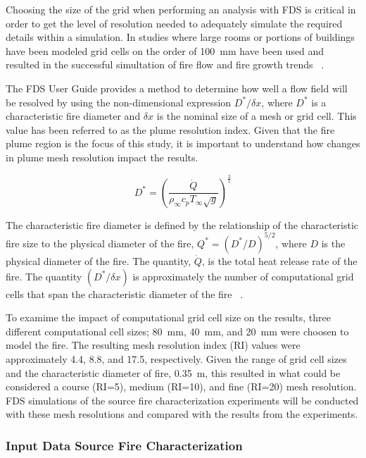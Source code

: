 \documentclass[twoside]{uocthesis}
\begin{document}
{Choosing the size of the grid when performing an analysis with FDS is critical in order to get the level of resolution needed to adequately simulate the required details within a simulation. In studies where large rooms or portions of buildings have been modeled grid cells on the order of 100~mm have been used and resulted in the successful simultation of fire flow and fire growth trends ~\cite{Grosshandler:Station,Madrzykowski:2004,Vettori:2000, Barowy:2012,Overholt:San_Francisco,Weinschenk:Chicago}.

 The FDS User Guide provides a method to determine how well a flow field will be resolved by using the non-dimensional expression ${D^*}/{\delta x}$, where $D^*$ is a characteristic fire diameter and $\delta x$ is the nominal size of a mesh or grid cell. This value has been referred to as the plume resolution index. Given that the fire plume region is the focus of this study, it is important to understand how changes in plume mesh resolution impact the results.    

\begin{equation}
 D^* = \left(
     \frac{\dot Q}{\rho_\infty  c_p  T_\infty  \sqrt{g} }
     \right)^\frac{2}{5} 
 \end{equation}


The characteristic fire diameter is defined by the relationship of the characteristic fire size to the physical diameter of the fire, ${Q^*} = ({D^*}/{D})^{5/2}$, where $D$ is the physical diameter of the fire. The quantity, $\dot Q$, is the total heat release rate of the fire. The quantity $({D^*}/{\delta x})$ is approximately the number of computational grid cells that span the characteristic diameter of the fire ~\cite{FDS_Users_Guide,FDS_Validation_Guide}.  

To examime the impact of computational grid cell size on the results, three different computational cell sizes; 80~mm, 40~mm, and 20~mm were choosen to model the fire. The resulting mesh resolution index (RI) values were approximately 4.4, 8.8, and 17.5, respectively. Given the range of grid cell sizes and the characteristic diameter of fire, 0.35~m, this resulted in what could be considered a course (RI=5), medium (RI=10), and fine (RI=20) mesh resolution.  FDS simulations of the source fire characterization experiments will be conducted with these mesh resolutions and compared with the results from the experiments.

\subsubsection{Input Data Source Fire Characterization}

}
\end{document}
